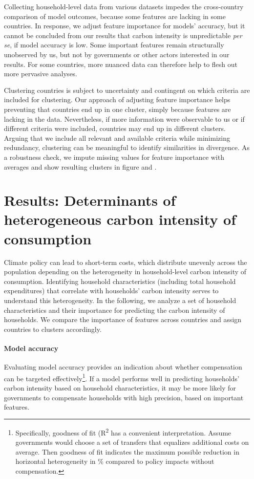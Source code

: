 \documentclass[12pt, a4paper]{article}
\begin{document}
Collecting household-level data from various datasets impedes the cross-country comparison of model outcomes, because some features are lacking in some countries. In response, we adjust feature importance for models' accuracy, but it cannot be concluded from our results that carbon intensity is unpredictable \textit{per se}, if model accuracy is low. Some important features remain structurally unobserved by us, but not by governments or other actors interested in our results. For some countries, more nuanced data can therefore help to flesh out more pervasive analyses.

Clustering countries is subject to uncertainty and contingent on which criteria are included for clustering. Our approach of adjusting feature importance helps preventing that countries end up in one cluster, simply because features are lacking in the data. Nevertheless, if more information were observable to us or if different criteria were included, countries may end up in different clusters. Arguing that we include all relevant and available criteria while minimizing redundancy, clustering can be meaningful to identify similarities in divergence. As a robustness check, we impute missing values for feature importance with averages and show resulting clusters in figure  and .

\section{Results: Determinants of heterogeneous carbon intensity of consumption} \label{sec:results}

Climate policy can lead to short-term costs, which distribute unevenly across the population depending on the heterogeneity in household-level carbon intensity of consumption. Identifying household characteristics (including total household expenditures) that correlate with households' carbon intensity serves to understand this heterogeneity. In the following, we analyze a set of household characteristics and their importance for predicting the carbon intensity of households. We compare the importance of features across countries and assign countries to clusters accordingly.

\paragraph{Model accuracy} 
Evaluating model accuracy provides an indication about whether compensation can be targeted effectively\footnote{Specifically, goodness of fit (R\textsuperscript{2} has a convenient interpretation. Assume governments would choose a set of transfers that equalizes additional costs on average. Then goodness of fit indicates the maximum possible reduction in horizontal heterogeneity in \% compared to policy impacts without compensation.}. If a model performs well in predicting households' carbon intensity based on household characteristics, it may be more likely for governments to compensate households with high precision, based on important features. 
\end{document}
